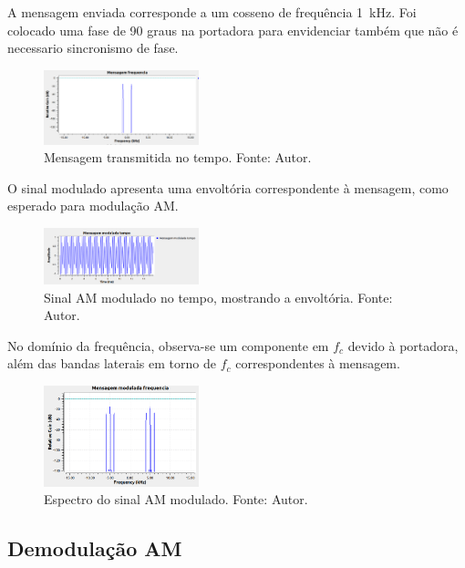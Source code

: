 A mensagem enviada corresponde a um cosseno de frequência 1~kHz. Foi colocado uma fase de 90 graus na portadora para envidenciar também que não é necessario sincronismo de fase. 

\begin{figure}[!htpb]
    \centering
    \includegraphics[width=0.4\textwidth]{images/mensagem_am_gnu.png}
    \caption{Mensagem transmitida no tempo. Fonte: Autor.}
    \label{fig:mensagem_am_tempo}
\end{figure}

O sinal modulado apresenta uma envoltória correspondente à mensagem, como esperado para modulação AM.

\begin{figure}[!htpb]
    \centering
    \includegraphics[width=0.4\textwidth]{images/envoltoria_gnu.png}
    \caption{Sinal AM modulado no tempo, mostrando a envoltória. Fonte: Autor.}
    \label{fig:envoltoria_am}
\end{figure}

No domínio da frequência, observa-se um componente em $f_c$ devido à portadora, além das bandas laterais em torno de $f_c$ correspondentes à mensagem.

\begin{figure}[!htpb]
    \centering
    \includegraphics[width=0.4\textwidth]{images/mensagem_am_modulada_gnu.png}
    \caption{Espectro do sinal AM modulado. Fonte: Autor.}
    \label{fig:espectro_am_modulada}
\end{figure}

\subsection{Demodulação AM}

